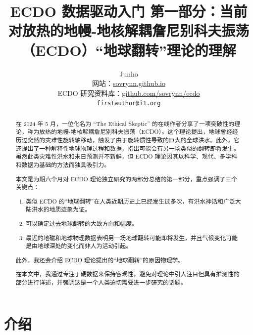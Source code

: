 \documentclass[10pt,twocolumn,letterpaper]{article}
\begin{document}
\title{ECDO 数据驱动入门 第一部分：当前对放热的地幔-地核解耦詹尼别科夫振荡（ECDO）“地球翻转”理论的理解}

\author{Junho\\
网站：\href{https://sovrynn.github.io}{sovrynn.github.io}\\
ECDO 研究资料库：\href{https://github.com/sovrynn/ecdo}{github.com/sovrynn/ecdo}\\
{\tt\small firstauthor@i1.org}
}

\maketitle

\begin{abstract}
在 2024 年 5 月，一位化名为 “The Ethical Skeptic” \cite{0} 的在线作者分享了一项突破性的理论，称为放热的地幔-地核解耦詹尼别科夫振荡（ECDO）\cite{1}。这个理论提出，地球曾经经历过突然的灾难性旋转轴移动，触发了由于旋转惯性导致的巨大的全球洪水。此外，它还提出了一种解释性地球物理过程和数据，指出可能会有另一场类似的翻转即将发生。虽然此类灾难性洪水和末日预测并不新鲜，但 ECDO 理论因其以科学、现代、多学科和数据为基础的方法而独具吸引力。

本文是为期六个月对 ECDO 理论独立研究的两部分总结的第一部分\cite{2,20}，重点强调了三个关键点：

\begin{flushleft}
\begin{enumerate}
    \item 类似 ECDO 的“地球翻转”在人类近期历史上已经发生过多次，有洪水神话和广泛大陆洪水的地质迹象为证。
    \item 可以确定过去地球翻转的大致方向和幅度。
    \item 最近的地磁和地球物理数据表明另一场地球翻转可能即将发生，并且气候变化可能是由地球深处的变化而非人为活动引起。
\end{enumerate}
\end{flushleft}

此外，我还会介绍 ECDO 理论提出的“地球翻转”的原因物理学。

在本文中，我通过专注于硬数据来保持客观性，避免对理论中引人注目但具有推测性的部分进行详述，并强调这是一个人类迫切需要进一步研究的话题。
\end{abstract}

\section{介绍}
\end{document}
